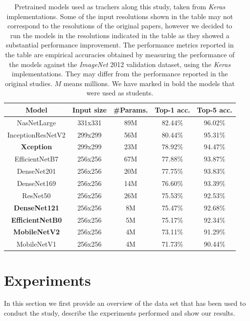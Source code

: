 \documentclass{elsarticle}
\begin{document}
	\begin{table}[h]
		\small
		\caption{Pretrained models used as trachers along this study, taken from \textit{Keras} implementations. Some of the input resolutions shown in the table may not correspond to the resolutions of the original papers, however we decided to run the models in the resolutions indicated in the table as they showed a substantial performance improvement. The performance metrics reported in the table are empirical accuracies obtained by measuring the performance of the models against the \textit{ImageNet} 2012 validation dataset, using the \textit{Keras} implementations. They may differ from the performance reported in the original studies. $M$ means millions. We have marked in bold the models that were used as students.}
		\centering
	\begin{tabular}{c|cc|cc}
		\toprule
		         Model          & Input size & \#Params. & Top-1 acc. & Top-5 acc. \\ \midrule
		      NasNetLarge       &  331x331   &    89M    &  82.44\%   &  96.02\%   \\
		   InceptionResNetV2    &  299x299   &    56M    &  80.44\%   &  95.31\%   \\
		   \textbf{Xception}    &  299x299   &    23M    &  78.92\%   &  94.47\%   \\
		    EfficientNetB7      &  256x256   &    67M    &  77.88\%   &  93.87\%   \\
		      DenseNet201       &  256x256   &    20M    &  77.75\%   &  93.83\%   \\
		      DenseNet169       &  256x256   &    14M    &  76.60\%   &  93.39\%   \\
		       ResNet50         &  256x256   &    26M    &  75.53\%   &  92.53\%   \\
		 \textbf{DenseNet121}   &  256x256   &    8M     &  75.47\%   &  92.68\%   \\
		\textbf{EfficientNetB0} &  256x256   &    5M     &  75.17\%   &  92.34\%   \\
		 \textbf{MobileNetV2}   &  256x256   &    4M     &  73.11\%   &  91.29\%   \\
		      MobileNetV1       &  256x256   &    4M     &  71.73\%   &  90.44\%   \\ \bottomrule
	\end{tabular}
	\label{table:models}
	\end{table}

	\section{Experiments} \label{sec:experiments}
	In this section we first provide an overview of the data set that has been used to conduct the study, describe the experiments performed and show our results.
\end{document}
